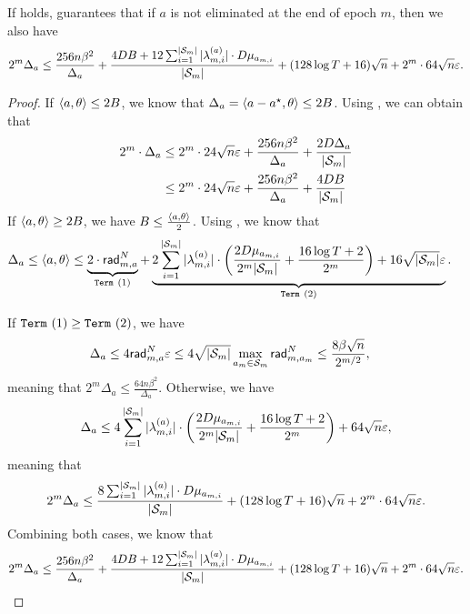 \begin{lemma}\label{lem:bound_2_mis}
    If  holds,  guarantees that if $a$ is not eliminated at the end of epoch $m$, then we also have
    \begin{align*}
        2^m\Delta_a\leq \frac{256n\beta^2}{\Delta_a} +\frac{4DB + 12\sum_{i=1}^{|{\mathcal{S}}_m|}|\lambda_{m,i}^{(a)}|\cdot D\mu_{a_{m,i}}}{|{\mathcal{S}}_m|}+(128\log T +16)\sqrt{n}+2^m\cdot 64\sqrt{n}\varepsilon.
    \end{align*}
\end{lemma}
\begin{proof}
    If $\left\langle {a,\theta} \right\rangle\leq 2B$, we know that $\Delta_a = \left\langle {a-a^\star,\theta} \right\rangle \leq 2B$. Using , we can obtain that
    \begin{align*}
        2^m\cdot \Delta_a &\leq 2^m\cdot 24\sqrt{n}\varepsilon+\frac{256n\beta^2}{\Delta_a} + \frac{2D\Delta_a}{|{\mathcal{S}}_m|} \\
        &\leq 2^m\cdot 24\sqrt{n}\varepsilon+\frac{256n\beta^2}{\Delta_a} + \frac{4DB}{|{\mathcal{S}}_m|}
    \end{align*}
    If $\left\langle {a,\theta} \right\rangle\geq 2B$, we have $B\leq \frac{\left\langle {a,\theta} \right\rangle}{2}$. Using , we know that
    \begin{align*}
        \Delta_a &\leq \left\langle {a,\theta} \right\rangle \leq \underbrace{2\cdot \mathsf{rad}_{m,a}^{N}}_{\texttt{Term} ~(1)}+ \underbrace{2\sum_{i=1}^{|{\mathcal{S}}_m|}|\lambda_{m,i}^{(a)}|\cdot\left(\frac{2D\mu_{a_{m,i}}}{2^m|{\mathcal{S}}_m|}+\frac{16\log T +2}{2^m}\right) + 16\sqrt{|{\mathcal{S}}_m|}\varepsilon}_{\texttt{Term} ~(2)}.
    \end{align*}

    If $\texttt{Term} ~(1)\geq \texttt{Term} ~(2)$, we have
    \begin{align*}
        \Delta_a &\leq 4\mathsf{rad}_{m,a}^{N} \varepsilon \leq 4\sqrt{|{\mathcal{S}}_m|}\max_{a_m\in{\mathcal{S}}_m}\mathsf{rad}_{m,a_m}^N \leq \frac{8\beta\sqrt{n}}{2^{m/2}},
    \end{align*}
    meaning that $2^m\Delta_a \leq \frac{64n\beta^2}{\Delta_a}$.
    Otherwise, we have
    \begin{align*}
        \Delta_a\leq 4\sum_{i=1}^{|{\mathcal{S}}_m|}|\lambda_{m,i}^{(a)}|\cdot \left(\frac{2D\mu_{a_{m,i}}}{2^m|{\mathcal{S}}_m|}+\frac{16\log T +2}{2^m}\right) + 64\sqrt{n}\varepsilon,
    \end{align*}
    meaning that
    \begin{align*}
        2^m\Delta_a\leq \frac{8\sum_{i=1}^{|{\mathcal{S}}_m|}|\lambda_{m,i}^{(a)}|\cdot D\mu_{a_{m,i}}}{|{\mathcal{S}}_m|}+(128\log T +16)\sqrt{n}+2^m\cdot 64\sqrt{n}\varepsilon.
    \end{align*}
    Combining both cases, we know that
    \begin{align*}
        2^m\Delta_a\leq \frac{256n\beta^2}{\Delta_a} +\frac{4DB + 12\sum_{i=1}^{|{\mathcal{S}}_m|}|\lambda_{m,i}^{(a)}|\cdot D\mu_{a_{m,i}}}{|{\mathcal{S}}_m|}+(128\log T +16)\sqrt{n}+2^m\cdot 64\sqrt{n}\varepsilon.
    \end{align*}
\end{proof}

